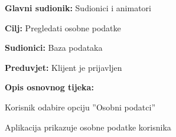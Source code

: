 \noindent {}
\begin{packed_item}

	\item \textbf{Glavni sudionik: }Sudionici i animatori
	\item  \textbf{Cilj:} Pregledati osobne podatke
	\item  \textbf{Sudionici:} Baza podataka
	\item  \textbf{Preduvjet:} Klijent je prijavljen
	\item  \textbf{Opis osnovnog tijeka:}

	\item[] \begin{packed_enum}

				\item Korisnik odabire opciju ”Osobni podatci”
				\item Aplikacija prikazuje osobne podatke korisnika
	\end{packed_enum}



\end{packed_item}
\pagebreak
\vspace{5mm} %


